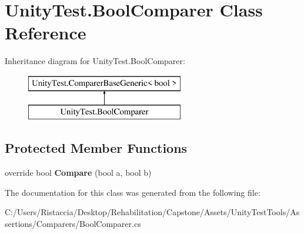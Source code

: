 \hypertarget{class_unity_test_1_1_bool_comparer}{}\section{Unity\+Test.\+Bool\+Comparer Class Reference}
\label{class_unity_test_1_1_bool_comparer}
Inheritance diagram for Unity\+Test.\+Bool\+Comparer\+:\begin{figure}[H]
\begin{center}
\leavevmode
\includegraphics[height=2.000000cm]{class_unity_test_1_1_bool_comparer}
\end{center}
\end{figure}
\subsection*{Protected Member Functions}
\begin{DoxyCompactItemize}
\item 
\mbox{\label{class_unity_test_1_1_bool_comparer_a946ed721b1e6f24bca0d5b33e235d0df}} 
override bool {\bfseries Compare} (bool a, bool b)
\end{DoxyCompactItemize}


The documentation for this class was generated from the following file\+:\begin{DoxyCompactItemize}
\item 
C\+:/\+Users/\+Ristaccia/\+Desktop/\+Rehabilitation/\+Capstone/\+Assets/\+Unity\+Test\+Tools/\+Assertions/\+Comparers/Bool\+Comparer.\+cs\end{DoxyCompactItemize}
